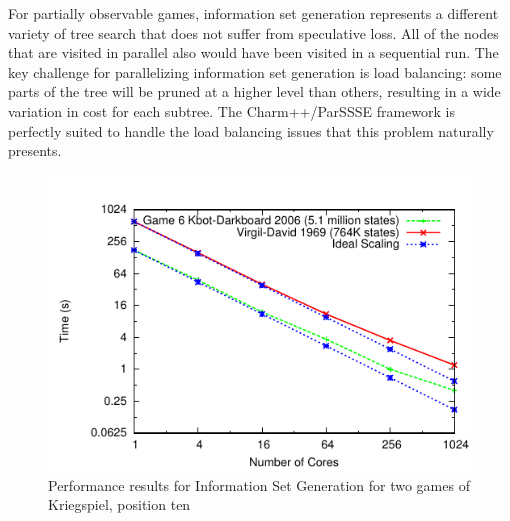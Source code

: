 \documentclass[10pt, conference, compsocconf]{IEEEtran}
\begin{document}
For partially observable games, information set generation represents a
different variety of tree search that does not suffer from speculative loss.
All of the nodes that are visited in parallel also would have been visited in a
sequential run.  The key challenge for parallelizing information set generation
is load balancing: some parts of the tree will be pruned at a higher level than
others, resulting in a wide variation in cost for each subtree.  The {\sc
Charm++/ParSSSE} framework is perfectly suited to handle the load balancing
issues that this problem naturally presents.

\begin{figure}[t]
 \centering \includegraphics[scale=1]{plots/new.pdf} %
\caption{Performance results for Information Set Generation for two games of Kriegspiel, position ten}
\label{prob4}
\vspace{-0.2in} 
\end{figure}
\end{document}
